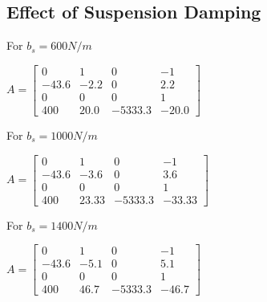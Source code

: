\documentclass[12pt, a4paper, oneside]{report}
\begin{document}
\subsection{Effect of Suspension Damping}


    For $b_s = 600 N/m$ 

    $A = \begin{bmatrix}
        0     & 1    & 0       & -1     \\
        -43.6 & -2.2 & 0       & 2.2    \\
        0     & 0    & 0       & 1      \\
        400   & 20.0 & -5333.3 & -20.0 
    \end{bmatrix}$\hfill \break

    For $b_s = 1000 N/m$ 

    $A = \begin{bmatrix}
        0     & 1    & 0       & -1      \\
        -43.6 & -3.6 & 0       & 3.6     \\
        0     & 0    & 0       & 1       \\
        400   & 23.33 & -5333.3 & -33.33 
    \end{bmatrix}$\hfill \break

    For $b_s = 1400 N/m$ 

    $A = \begin{bmatrix}
        0     & 1    & 0       & -1      \\
        -43.6 & -5.1 & 0       & 5.1     \\
        0     & 0    & 0       & 1       \\
        400   & 46.7 & -5333.3 & -46.7
    \end{bmatrix}$\hfill \break
\end{document}
